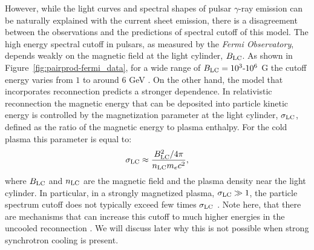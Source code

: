 However, while the light curves and spectral shapes of pulsar $\gamma$-ray emission can be naturally explained with the current sheet emission, there is a disagreement between the observations and the predictions of spectral cutoff of this model. The high energy spectral cutoff in pulsars, as measured by the {\it Fermi Observatory}, depends weakly on the magnetic field at the light cylinder, $B_{\rm LC}$. As shown in Figure~\ref{fig:pairprod-fermi_data}, for a wide range of $B_{\rm LC}=10^3\text{-}10^6$ G the cutoff energy varies from $1$ to around $6$ GeV \citep{2013ApJS..208...17A}. On the other hand, the model that incorporates reconnection predicts a stronger dependence. In relativistic reconnection the magnetic energy that can be deposited into particle kinetic energy is controlled by the magnetization parameter at the light cylinder, $\sigma_{\rm LC}$, defined as the ratio of the magnetic energy to plasma enthalpy. For the cold plasma this parameter is equal to:
\begin{equation}\label{eq:pairprod-sigma_def}
    \sigma_{\rm LC}\approx \frac{B_{\rm LC}^2/4\pi}{n_{\rm LC}m_e c^2},
\end{equation}
where $B_{\rm LC}$ and $n_{\rm LC}$ are the magnetic field and the plasma density near the light cylinder. In particular, in a strongly magnetized plasma, $\sigma_{\rm LC}\gg 1$, the particle spectrum cutoff does not typically exceed few times $\sigma_{\rm LC}$ \citep{2014ApJ...783L..21S, 2016ApJ...816L...8W}. Note here, that there are mechanisms that can increase this cutoff to much higher energies in the uncooled reconnection \citep{2018arXiv180800966P}. We will discuss later why this is not possible when strong synchrotron cooling is present.

